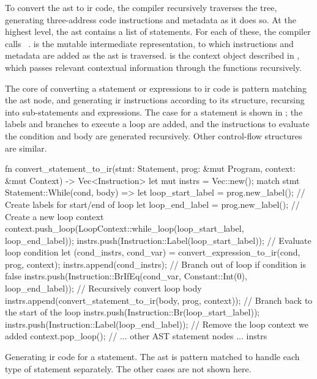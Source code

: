 \documentclass[00-main.tex]{subfiles}
\begin{document}
To convert the \gls{ast} to \gls{ir} code, the compiler recursively traverses the tree, generating three-address code instructions and metadata as it does so.
At the highest level, the \gls{ast} contains a list of statements.
For each of these, the compiler calls ~. %
 is the mutable intermediate representation, to which instructions and metadata are added as the \gls{ast} is traversed.
 is the context object described in , which passes relevant contextual information through the functions recursively.

The core of converting a statement or expressions to \gls{ir} code is pattern matching the \gls{ast} node, and generating \gls{ir} instructions according to its structure, recursing into sub-statements and expressions.
The case for a  statement is shown in ; the labels and branches to execute a  loop are added, and the instructions to evaluate the condition and body are generated recursively.
Other control-flow structures are similar.

\begin{listing}[t]
  \begin{RustListing}
    fn convert_statement_to_ir(stmt: Statement, prog: &mut Program, context: &mut Context)
            -> Vec<Instruction> {
        let mut instrs = Vec::new();
        match stmt {
            Statement::While(cond, body) => {
                let loop_start_label = prog.new_label(); // Create labels for start/end of loop
                let loop_end_label = prog.new_label();
                // Create a new loop context
                context.push_loop(LoopContext::while_loop(loop_start_label, loop_end_label));
                instrs.push(Instruction::Label(loop_start_label));
                // Evaluate loop condition
                let (cond_instrs, cond_var) = convert_expression_to_ir(cond, prog, context);
                instrs.append(cond_instrs);
                // Branch out of loop if condition is false
                instrs.push(Instruction::BrIfEq(cond_var, Constant::Int(0), loop_end_label));
                // Recursively convert loop body
                instrs.append(convert_statement_to_ir(body, prog, context));
                // Branch back to the start of the loop
                instrs.push(Instruction::Br(loop_start_label));
                instrs.push(Instruction::Label(loop_end_label));
                // Remove the loop context we added
                context.pop_loop();
            }
            // ... other AST statement nodes ...
        }
        instrs
    }
  \end{RustListing}
  \caption{Generating \gls{ir} code for a  statement. The \gls{ast} is pattern matched to handle each type of statement separately. The other cases are not shown here.}
  \label{lst:convert while stmt to IR}
\end{listing}
\end{document}
